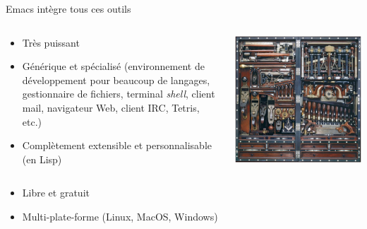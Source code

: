 \documentclass[t]{beamer}
\begin{document}
\begin{frame}[label={sec:orgacaeb54}]{Emacs intègre tous ces outils}
\begin{columns}
\begin{column}{0.57\columnwidth}
\begin{itemize}
\item Très puissant
\item Générique et spécialisé (environnement de développement pour beaucoup de
langages, gestionnaire de fichiers, terminal \emph{shell}, client mail, navigateur
Web, client IRC, Tetris, etc.)
\item Complètement extensible et personnalisable (en Lisp)
\end{itemize}
\end{column}

\begin{column}{0.4\columnwidth}
\begin{center}
\includegraphics[width=\linewidth]{images/toolbox-tidy.png}
\end{center}
\end{column}
\end{columns}

\begin{itemize}
\item Libre et gratuit
\item Multi-plate-forme (Linux, MacOS, Windows)
\end{itemize}
\end{frame}
\end{document}
